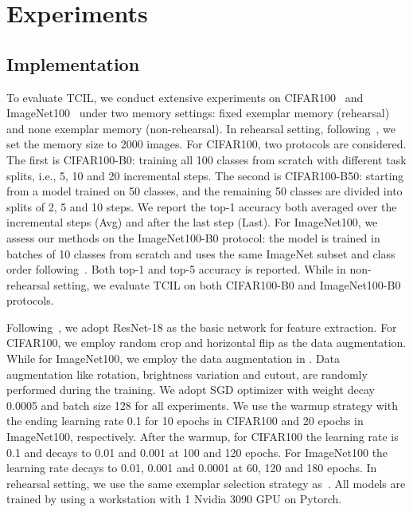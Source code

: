 \documentclass[letterpaper]{article} \usepackage{aaai23}  \usepackage{times}  \usepackage{helvet}  \usepackage{courier}  \usepackage[hyphens]{url}  \usepackage{graphicx} \urlstyle{rm} \def\UrlFont{\rm}  \usepackage{natbib}  \usepackage{caption} \frenchspacing  \setlength{\pdfpagewidth}{8.5in}  \setlength{\pdfpageheight}{11in}  \usepackage{algorithm}
\begin{document}
\section{Experiments}\label{experiment}

\subsection{Implementation}
To evaluate TCIL, we conduct extensive experiments on CIFAR100~\cite{e6} and ImageNet100~\cite{e7} under two memory settings: fixed exemplar memory (rehearsal) and none exemplar memory (non-rehearsal). In rehearsal setting, following~\cite{t0, t70, t54, t19}, we set the memory size to 2000 images. For CIFAR100, two protocols are considered. The first is CIFAR100-B0: training all 100 classes from scratch with different task splits, i.e., 5, 10 and 20 incremental steps. The second is CIFAR100-B50: starting from a model trained on 50 classes, and the remaining 50 classes are divided into splits of 2, 5 and 10 steps. We report the top-1 accuracy both averaged over the incremental steps (Avg) and after the last step (Last). For ImageNet100, we assess our methods on the ImageNet100-B0 protocol: the model is trained in batches of 10 classes from scratch and uses the same ImageNet subset and class order following~\cite{t19, t32, t54, t70}. Both top-1 and top-5 accuracy is reported. While in non-rehearsal setting, we evaluate TCIL on both CIFAR100-B0 and ImageNet100-B0 protocols. 

Following~\cite{t47, t70}, we adopt ResNet-18 as the basic network for feature extraction. For CIFAR100, we employ random crop and horizontal flip as the data augmentation. While for ImageNet100, we employ the data augmentation in \cite{e13}. Data augmentation like rotation, brightness variation and cutout, are randomly performed during the training. We adopt SGD optimizer with weight decay 0.0005 and batch size 128 for all experiments. We use the warmup strategy with the ending learning rate 0.1 for 10 epochs in CIFAR100 and 20 epochs in ImageNet100, respectively. After the warmup, for CIFAR100 the learning rate is 0.1 and decays to 0.01 and 0.001 at 100 and 120 epochs. For ImageNet100 the learning rate decays to 0.01, 0.001 and 0.0001 at 60, 120 and 180 epochs. In rehearsal setting, we use the same exemplar selection strategy as~\cite{t54, t32}. All models are trained by using a workstation with 1 Nvidia 3090 GPU on Pytorch.
\end{document}
